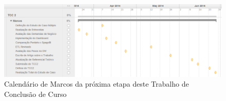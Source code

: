 \begin{figure}[ht!]
\centering
\includegraphics[bb=0 0 1257 350, scale=0.48]{figuras/tcc2-marcos.png}
\caption{Calendário de Marcos da próxima etapa deste Trabalho de Conclusão de Curso}
\label{calendar}
\end{figure}
\FloatBarrier